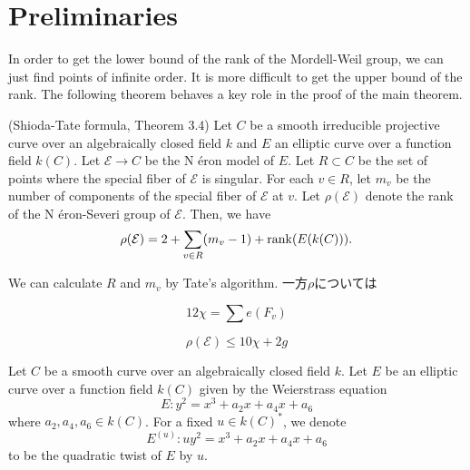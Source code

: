 \documentclass[main]{subfiles}
\begin{document}
\chapter{Preliminaries}

In order to get the lower bound of the rank of the Mordell-Weil group, we can just find points of infinite order.
It is more difficult to get the upper bound of the rank.
The following theorem behaves a key role in the proof of the main theorem.
\begin{thm}{(Shioda-Tate formula, \cite{ref:naskrecki2013} Theorem 3.4)}
    \label{thm:shioda}
    Let $C$ be a smooth irreducible projective curve over an algebraically closed field $k$ and $E$ an elliptic curve over a function field $k(C)$.
    Let $\mathcal{E} \to C$ be the N \'eron model of $E$.
    Let $R \subset C$ be the set of points where the special fiber of $\mathcal{E}$ is singular.
    For each $v \in R$, let $m_{v}$ be the number of components of the special fiber of $\mathcal{E}$ at $v$.
    Let $\rho(\mathcal{E})$ denote the rank of the N \'eron-Severi group of $\mathcal{E}$.
    Then, we have
    \begin{equation}
        \rho (\mathcal{E}) = 2 + \sum_{v \in R} (m_{v} - 1) + \operatorname{rank}(E(k(C))).
    \end{equation}
\end{thm}

We can calculate $R$ and $m_{v}$ by Tate's algorithm.
一方$\rho$については

\begin{equation}
    12 \chi = \sum e(F_{v})
\end{equation}

\begin{thm}
    \label{thm:rho}
    \begin{equation}
        \rho(\mathcal{E}) \leq 10 \chi + 2g
    \end{equation}
\end{thm}

\begin{dfn}
    Let $C$ be a smooth curve over an algebraically closed field $k$.
    Let $E$ be an elliptic curve over a function field $k(C)$ given by the Weierstrass equation
    \begin{equation}
        E: y^{2} = x^{3} + a_{2} x + a_{4} x + a_{6}
    \end{equation}
    where $a_{2}, a_{4}, a_{6} \in k(C)$.
    For a fixed $u \in k(C)^*$, we denote
    \begin{equation}
        E^{(u)}: u y^{2} = x^{3} + a_{2} x + a_{4} x + a_{6}
    \end{equation}
    to be the quadratic twist of $E$ by $u$.
\end{dfn}
\end{document}
